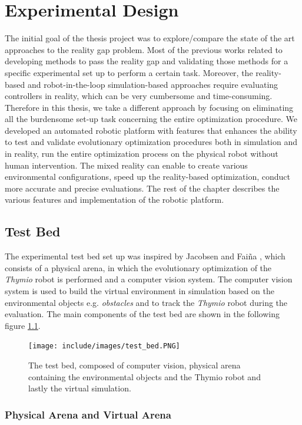 \chapter{Experimental Design}

The initial goal of the thesis project was to explore/compare the state of the art approaches to the reality gap problem. Most of the previous works related to developing methods to pass the reality gap and validating those methods for a specific experimental set up to perform a certain task. Moreover, the reality-based and robot-in-the-loop simulation-based approaches require evaluating controllers in reality, which can be very cumbersome and time-consuming. Therefore in this thesis, we take a different approach by focusing on eliminating all the burdensome set-up task concerning the entire optimization procedure. We developed an automated robotic platform with features that enhances the ability to test and validate evolutionary optimization procedures both in simulation and in reality, run the entire optimization process on the physical robot without human intervention. The mixed reality can enable to create various environmental configurations, speed up the reality-based optimization, conduct more accurate and precise evaluations. The rest of the chapter describes the various features and implementation of the robotic platform.


\section{Test Bed}
The experimental test bed set up was inspired by Jacobsen and Faiña \citep{faina2017automating}, which consists of a physical arena, in which the evolutionary optimization of the \emph{Thymio} robot is performed and a computer vision system. The computer vision system is used to build the virtual environment in simulation based on the environmental objects e.g. \emph{obstacles} and to track the \emph{Thymio} robot during the evaluation. The main components of the test bed are shown in the following figure \ref{fig:test_bed}.

\begin{figure}[H]
  \centering
  \texttt{[image: include/images/test\_bed.PNG]}
  \caption{The test bed, composed of computer vision, physical arena containing the environmental objects and the Thymio robot and lastly the virtual simulation.}
  \label{fig:test_bed}
\end{figure}

\subsection{Physical Arena and Virtual Arena}

